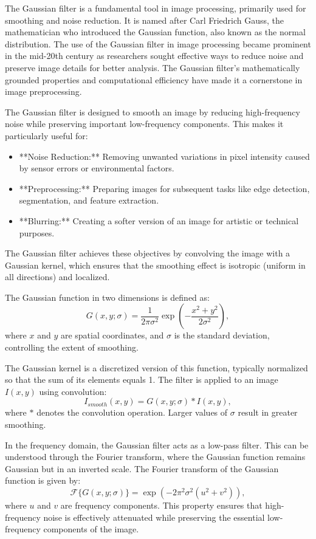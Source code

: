 \documentclass[11pt]{book}
\begin{document}
The Gaussian filter is a fundamental tool in image processing, primarily used for smoothing and noise reduction. It is named after Carl Friedrich Gauss, the mathematician who introduced the Gaussian function, also known as the normal distribution. The use of the Gaussian filter in image processing became prominent in the mid-20th century as researchers sought effective ways to reduce noise and preserve image details for better analysis. The Gaussian filter's mathematically grounded properties and computational efficiency have made it a cornerstone in image preprocessing.

The Gaussian filter is designed to smooth an image by reducing high-frequency noise while preserving important low-frequency components. This makes it particularly useful for:
\begin{itemize}
    \item **Noise Reduction:** Removing unwanted variations in pixel intensity caused by sensor errors or environmental factors.
    \item **Preprocessing:** Preparing images for subsequent tasks like edge detection, segmentation, and feature extraction.
    \item **Blurring:** Creating a softer version of an image for artistic or technical purposes.
\end{itemize}

The Gaussian filter achieves these objectives by convolving the image with a Gaussian kernel, which ensures that the smoothing effect is isotropic (uniform in all directions) and localized.

The Gaussian function in two dimensions is defined as:
\[
G(x, y; \sigma) = \frac{1}{2\pi\sigma^2} \exp\left(-\frac{x^2 + y^2}{2\sigma^2}\right),
\]
where $x$ and $y$ are spatial coordinates, and $\sigma$ is the standard deviation, controlling the extent of smoothing.

The Gaussian kernel is a discretized version of this function, typically normalized so that the sum of its elements equals 1. The filter is applied to an image $I(x, y)$ using convolution:
\[
I_{smooth}(x, y) = G(x, y; \sigma) * I(x, y),
\]
where $*$ denotes the convolution operation. Larger values of $\sigma$ result in greater smoothing.

In the frequency domain, the Gaussian filter acts as a low-pass filter. This can be understood through the Fourier transform, where the Gaussian function remains Gaussian but in an inverted scale. The Fourier transform of the Gaussian function is given by:
\[
\mathcal{F}\{G(x, y; \sigma)\} = \exp\left(-2\pi^2 \sigma^2 (u^2 + v^2)\right),
\]
where $u$ and $v$ are frequency components. This property ensures that high-frequency noise is effectively attenuated while preserving the essential low-frequency components of the image.
\end{document}
